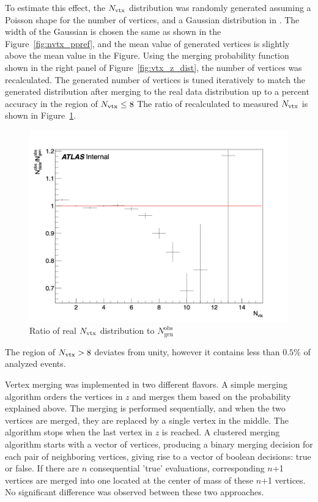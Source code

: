 To estimate this effect, the $N_\text{vtx}$ distribution was randomly generated assuming a Poisson shape for the number of vertices, and a Gaussian distribution in \zvtx. The width of the Gaussian is chosen the same as shown in the Figure~\ref{fig:nvtx_ppref}, and the mean value of generated vertices is slightly above the mean value in the Figure. Using the merging probability function shown in the right panel of Figure~\ref{fig:vtx_z_dist}, the number of vertices was recalculated. 
The generated number of vertices is tuned iteratively to match the generated distribution after merging to the real data distribution up to a percent accuracy in the region of $N_\text{vtx} \leq 8$ %
The ratio of recalculated to measured $N_\text{vtx}$ is shown in Figure~\ref{fig:ratio_nvtx_real_over_fake}.
  \begin{figure}[h]
      \centering
      \includegraphics[width=0.5\linewidth]{images/nvtx_gen_real.png}
      \caption{Ratio of real $N_\text{vtx}$ distribution to $N_\text{gen}^\text{obs}$}
      \label{fig:ratio_nvtx_real_over_fake}
  \end{figure}
The region of $N_\text{vtx} > 8$ deviates from unity, however it contains less than $0.5\%$ of analyzed events.

Vertex merging was implemented in two different flavors. A simple merging algorithm orders the vertices in $z$ and merges them based on the probability explained above. The merging is performed sequentially, and when the two vertices are merged, they are replaced by a single vertex in the middle. The algorithm stops when the last vertex in $z$ is reached. A clustered merging algorithm starts with a vector of vertices, producing a binary merging decision for each pair of neighboring vertices, giving rise to a vector of boolean decisions: true or false. If there are $n$ consequential 'true' evaluations, corresponding $n$+1 vertices are merged into one located at the center of mass of these $n$+1 vertices. No significant difference was observed between these two approaches. %


